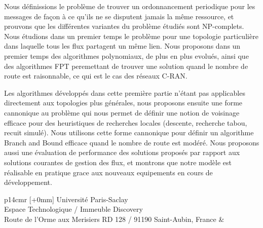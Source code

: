 \begin{mdframed}[linecolor=Prune,linewidth=1]
\begin{small}
\begin{multicols}{2}
Nous définissions le problème de trouver un ordonnancement periodique pour les messages de façon à ce qu'ils ne se disputent jamais la même ressource, et prouvons que les différentes variantes du problème étudiés sont NP-complets. Nous étudions dans un premier temps le problème pour une topologie particulière dans laquelle tous les flux partagent un même lien. Nous proposons dans un premier temps des algorithmes polynomiaux, de plus en plus evolués, ainsi que des algorithmes FPT peremettant de trouver une solution quand le nombre de route est raisonnable, ce qui est le cas des réseaux C-RAN.

Les algorithmes développés dans cette première partie n’étant pas applicables directement aux topologies plus générales, nous proposons ensuite une forme cannonique au problème qui nous permet de définir une notion de voisinage efficace pour des heuristiques de recherches locales (descente, recherche tabou, recuit simulé). Nous utilisons cette forme cannonique pour définir un algorithme Branch and Bound efficace quand le nombre de route est modéré.
Nous proposons aussi une évaluation de performance des solutions proposés par rapport aux solutions courantes de gestion des flux, et montrons que notre modèle est réalisable en pratique grace aux nouveaux equipements en cours de développement.
\end{multicols}
\end{small}
\end{mdframed}

\vspace{5cm} %
\selectfont
\begin{tabular}{p{14cm}r}
[+0mm]{{\color{Prune} Université Paris-Saclay\\
Espace Technologique / Immeuble Discovery\\
Route de l’Orme aux Merisiers RD 128 / 91190 Saint-Aubin, France}} & \\
\end{tabular}
\newpage

